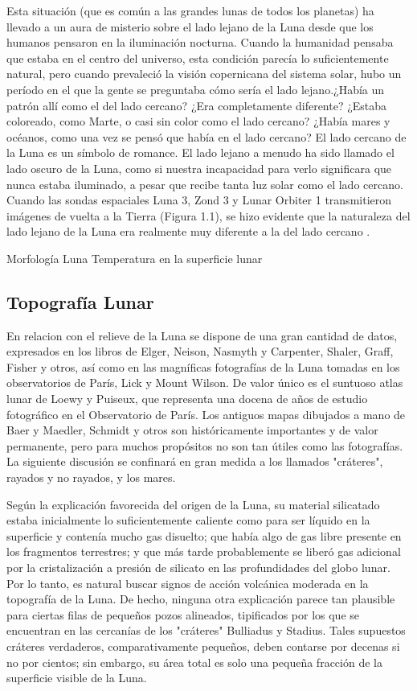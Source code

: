 \documentclass[12pt]{article}
\begin{document}
Esta situación (que es común a las grandes lunas de todos los planetas) ha llevado a un aura de 
misterio sobre el lado lejano de la Luna desde que los humanos pensaron en la iluminación nocturna. 
Cuando la humanidad pensaba que estaba en el centro del universo, esta condición parecía lo 
suficientemente natural, pero cuando prevaleció la visión copernicana del sistema solar, hubo un 
período en el que la gente se preguntaba cómo sería el lado lejano.¿Había un patrón allí como el del 
lado cercano? ¿Era completamente diferente? ¿Estaba coloreado, como Marte, o casi sin color como el 
lado cercano? ¿Había mares y océanos, como una vez se pensó que había en el lado cercano?
El lado cercano de la Luna es un símbolo de romance. El lado lejano a menudo ha sido llamado el 
lado oscuro de la Luna, como si nuestra incapacidad para verlo significara que nunca estaba iluminado, a pesar
que recibe tanta luz solar como el lado cercano. Cuando las sondas espaciales Luna 3, Zond 3 y Lunar Orbiter 
1 transmitieron imágenes de vuelta a la Tierra (Figura 1.1), se hizo evidente que la naturaleza del 
lado lejano de la Luna era realmente muy diferente a la del lado cercano \parencite{byrne2008far}.

Morfología Luna \parencite{PhysicsandAstronomyMoon}
Temperatura en la superficie lunar \parencite{Zhengling2024}
\subsection{Topografía Lunar}
En relacion con el relieve de la Luna se dispone de una gran cantidad de datos, expresados en los 
libros de Elger, Neison, Nasmyth y Carpenter, 
Shaler, Graff, Fisher y otros, así como en 
las magníficas fotografías de la Luna tomadas 
en los observatorios de París, Lick y Mount Wilson. 
De valor único es el suntuoso atlas lunar 
de Loewy y Puiseux, que representa una 
docena de años de estudio fotográfico en el Observatorio de París. 
Los antiguos mapas dibujados a mano 
de Baer y Maedler, Schmidt y otros son 
históricamente importantes y de valor permanente, 
pero para muchos propósitos no son tan útiles como las 
fotografías. La siguiente discusión se 
confinará en gran medida a los llamados "cráteres", 
rayados y no rayados, y los mares. 

Según la explicación favorecida 
del origen de la Luna, su material silicatado 
estaba inicialmente lo suficientemente caliente como para ser líquido en 
la superficie y contenía mucho gas disuelto; que 
había algo de gas libre presente en los fragmentos terrestres; 
y que más tarde probablemente se liberó gas adicional por la cristalización a presión de 
silicato en las profundidades del globo lunar. 
Por lo tanto, es natural buscar signos de acción volcánica moderada 
en la topografía de la Luna. De 
hecho, ninguna otra explicación parece tan plausible para 
ciertas filas de pequeños pozos alineados, tipificados por 
los que se encuentran en las cercanías de los "cráteres" Bulliadus y Stadius. 
Tales supuestos cráteres verdaderos, comparativamente pequeños, deben contarse por 
decenas si no por cientos; sin embargo, su área total es 
solo una pequeña fracción de la superficie visible de la 
Luna. 
\end{document}
